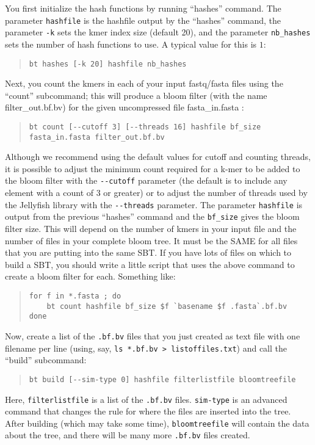 \documentclass{article}
\begin{document}
You first initialize the hash functions by running ``hashes'' command. The parameter \verb+hashfile+ is the hashfile output by the ``hashes'' command, the parameter \verb+-k+ sets the kmer index size (default 20), and the parameter \verb+nb_hashes+ sets the number of hash functions to use. A typical value for this is $1$:
%
\begin{quote}
\begin{verbatim}
bt hashes [-k 20] hashfile nb_hashes
\end{verbatim}
\end{quote}

Next, you count the kmers in each of your input fastq/fasta files using the ``count'' subcommand; this will produce a bloom filter (with the name filter\_out.bf.bv) for the given uncompressed file fasta\_in.fasta :
%
\begin{quote}
\begin{verbatim}
bt count [--cutoff 3] [--threads 16] hashfile bf_size fasta_in.fasta filter_out.bf.bv
\end{verbatim}
\end{quote}
%
Although we recommend using the default values for cutoff and counting threads, it is possible to adjust the minimum count required for a k-mer to be added to the bloom filter with the \verb+--cutoff+ parameter (the default is to include any element with a count of 3 or greater) or to adjust the number of threads used by the Jellyfish library with the \verb+--threads+ parameter. The parameter \verb+hashfile+ is output from the previous ``hashes'' command and the \verb+bf_size+ gives the bloom filter size. This will depend on the number of kmers in your input file and the number of files in your complete bloom tree. It must be the SAME for all files that you are putting into the same SBT. If you have lots of files on which to build a SBT, you should write a little script that uses the above command to create a bloom filter for each. Something like:
%
\begin{quote}
\begin{verbatim}
for f in *.fasta ; do 
    bt count hashfile bf_size $f `basename $f .fasta`.bf.bv
done
\end{verbatim}
\end{quote}

Now, create a list of the \verb+.bf.bv+ files that you just created as text file with one filename per line (using, say, \verb+ls *.bf.bv > listoffiles.txt+) and call the ``build'' subcommand:
\begin{quote}
\begin{verbatim}
bt build [--sim-type 0] hashfile filterlistfile bloomtreefile
\end{verbatim}
\end{quote}
Here, \verb+filterlistfile+ is a list of the \verb+.bf.bv+ files. \verb+sim-type+ is an advanced command that changes the rule for where the files are inserted into the tree. After building (which may take some time), \verb+bloomtreefile+ will contain the data about the tree, and there will be many more \verb+.bf.bv+ files created. 
\end{document}
